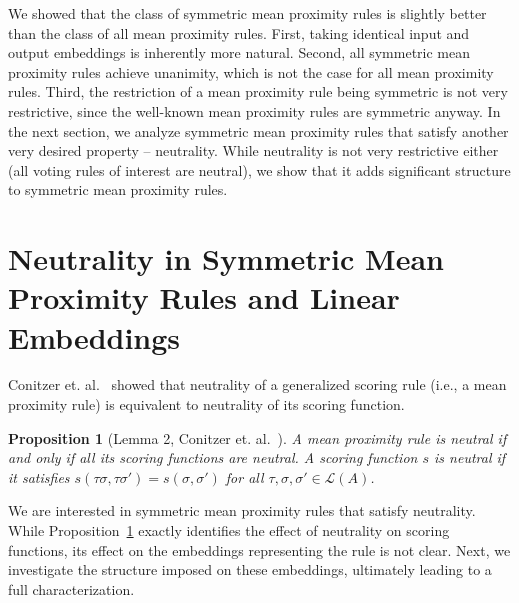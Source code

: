 \documentclass[10pt,letterpaper]{article}
\newcommand{\calL}{{\mathcal{L}}}
\newcommand{\rank}{{\calL(A)}}
\newtheorem{proposition}{Proposition}
\begin{document}

We showed that the class of symmetric mean proximity rules is slightly better than the class of all mean proximity rules. First, taking identical input and output embeddings is inherently more natural. Second, all symmetric mean proximity rules achieve unanimity, which is not the case for all mean proximity rules. Third, the restriction of a mean proximity rule being symmetric is not very restrictive, since the well-known mean proximity rules are symmetric anyway. In the next section, we analyze symmetric mean proximity rules that satisfy another very desired property -- neutrality. While neutrality is not very restrictive either (all voting rules of interest are neutral), we show that it adds significant structure to symmetric mean proximity rules. 


\section{Neutrality in Symmetric Mean Proximity Rules and Linear Embeddings}

Conitzer et. al.~\cite{CRX09} showed that neutrality of a generalized scoring rule (i.e., a mean proximity rule) is equivalent to neutrality of its scoring function.
\begin{proposition}[Lemma 2, Conitzer et. al.~\cite{CRX09}]
A mean proximity rule is neutral if and only if all its scoring functions are neutral. A scoring function $s$ is neutral if it satisfies $s(\tau \sigma,\tau \sigma') = s(\sigma,\sigma')$ for all $\tau, \sigma, \sigma' \in \rank$.
\label{prop:gsr-neutral}
\end{proposition}

We are interested in symmetric mean proximity rules that satisfy neutrality. While Proposition~\ref{prop:gsr-neutral} exactly identifies the effect of neutrality on scoring functions, its effect on the embeddings representing the rule is not clear. Next, we investigate the structure imposed on these embeddings, ultimately leading to a full characterization.
\end{document}
